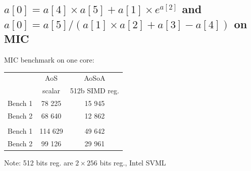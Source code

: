 \documentclass{beamer}
\begin{document}
\subsection*{$a[0] = a[4] \times a[5] + a[1] \times e^{a[2]}$ and $a[0] = a[5]/(a[1] \times a[2]+a[3]-a[4])$ on MIC}
\begin{frame}[fragile]
\centering
MIC benchmark on one core:

\begin{tabular}{ c c  |  c }
      & AoS & AoSoA\\
\color{C0}{float}                                     & scalar & 512b SIMD reg. \\
                           \hline
   Bench 1  & 78 225 & \cellcolor{C2}15 945 \\
   Bench 2  & 68 640 & \cellcolor{C2}12 862  \\
      \hline
        \color{C0}{double}                    &  &  \\
        Bench 1  & 114 629 & \cellcolor{C2}49 642 \\
   Bench 2  & 99 126 &\cellcolor{C2} 29 961  \\
\hline
\end{tabular}
\vspace{0.5cm}

Note: 512 bits reg. are $2 \times 256$ bits reg., Intel SVML



\end{frame}

\end{document}
